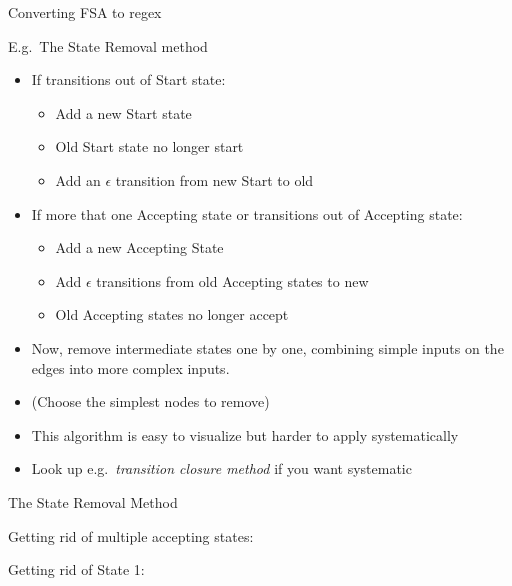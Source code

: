 \documentclass{beamer}
\def\dx{1cm} \def\dy{1.5cm}
\newcommand{\newState}[4]{\node[state,#3](#1)[#4]{#2};}
\newcommand{\newTransition}[4]{\path[->] (#1) edge [#4] node {#3} (#2);}
\begin{document}
\begin{frame}{Converting FSA to regex}

  E.g.\ The State Removal method
  \begin{itemize}
  \item If transitions out of Start state:
    \begin{itemize}
    \item Add a new Start state
    \item Old Start state no longer start
    \item Add an $\epsilon$ transition from new Start to old
    \end{itemize}
  \item If more that one Accepting state or transitions out of Accepting state:
    \begin{itemize}
    \item Add a new Accepting State
    \item Add $\epsilon$ transitions from old Accepting states to new
    \item Old Accepting states no longer accept
    \end{itemize}
  \item Now, remove intermediate states one by one, 
    combining simple inputs on the edges into more complex inputs.
  \item (Choose the simplest nodes to remove)
  \item This algorithm is easy to visualize but harder to apply systematically
  \item Look up e.g.\ {\it transition closure method} if you want systematic
  \end{itemize}
\end{frame}

\begin{frame}[t]{The State Removal Method}
\small
\begin{center}
  
  \vspace{0.5cm}
  
  Getting rid of multiple accepting states:
  
  \vspace{1.5cm}
  
  Getting rid of State 1:
\end{center}
\end{frame}
\end{document}
